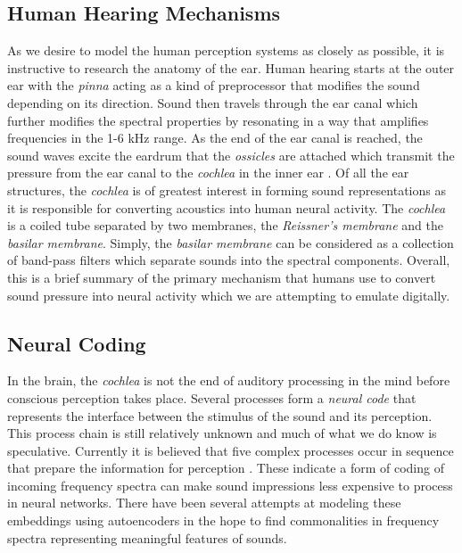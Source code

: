 \subsection{Human Hearing Mechanisms}
As we desire to model the human perception systems as closely as possible, it is instructive to research the anatomy of the ear. Human hearing starts at the outer ear with the \textit{pinna} acting as a kind of preprocessor that modifies the sound depending on its direction. Sound then travels through the ear canal which further modifies the spectral properties by resonating in a way that amplifies frequencies in the 1-6 kHz range. As the end of the ear canal is reached, the sound waves excite the eardrum that the \textit{ossicles} are attached which transmit the pressure from the ear canal to the \textit{cochlea} in the inner ear \cite{Plack2018}. Of all the ear structures, the \textit{cochlea} is of greatest interest in forming sound representations as it is responsible for converting acoustics into human neural activity. The \textit{cochlea} is a coiled tube separated by two membranes, the \textit{Reissner's membrane} and the \textit{basilar membrane}. Simply, the \textit{basilar membrane} can be considered as a collection of band-pass filters which separate sounds into the spectral components. Overall, this is a brief summary of the primary mechanism that humans use to convert sound pressure into neural activity which we are attempting to emulate digitally.

\subsection{Neural Coding}
In the brain, the \textit{cochlea} is not the end of auditory processing in the mind before conscious perception takes place. Several processes form a \textit{neural code} that represents the interface between the stimulus of the sound and its perception. This process chain is still relatively unknown and much of what we do know is speculative. Currently it is believed that five complex processes occur in sequence that prepare the information for perception \cite{Eggermont2001}. These indicate a form of coding of incoming frequency spectra can make sound impressions less expensive to process in neural networks. There have been several attempts at modeling these embeddings using autoencoders in the hope to find commonalities in frequency spectra representing meaningful features of sounds.

